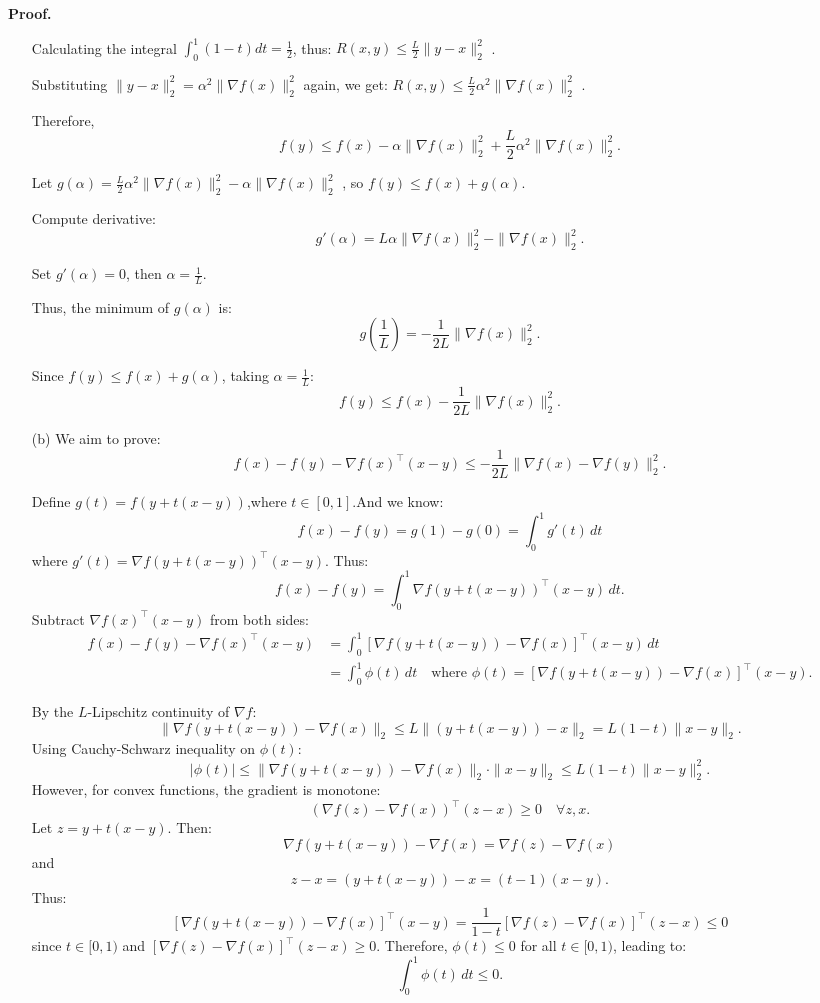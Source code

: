 \documentclass[a4paper, 11pt]{article}
\newenvironment{solution}
    {\textbf{Proof.}}
    {}
\begin{document}
\begin{solution}
\begin{enumerate}
Calculating the integral \( \int_0^1 (1 - t) dt = \frac{1}{2} \), thus: \( R(x, y) \leq \frac{L}{2} \|y - x\|_2^2 \) . 
	
Substituting \( \|y - x\|_2^2 = \alpha^2 \|\nabla f(x)\|_2^2 \) again, we get: \( R(x, y) \leq \frac{L}{2} \alpha^2 \|\nabla f(x)\|_2^2 \) . 

  
Therefore, 
$$ f(y) \leq f(x) - \alpha \|\nabla f(x)\|_2^2 + \frac{L}{2} \alpha^2 \|\nabla f(x)\|_2^2 .$$
 
Let  \(g(\alpha) = \frac{L}{2} \alpha^2 \|\nabla f(x)\|_2^2 - \alpha \|\nabla f(x)\|_2^2  \) ,	so  \(f(y) \leq f(x) + g(\alpha)\).

Compute derivative:  
$$ g'(\alpha) = L \alpha \|\nabla f(x)\|_2^2 - \|\nabla f(x)\|_2^2 .$$  

Set  \(g'(\alpha) = 0 \), then \( \alpha = \frac{1}{L} \).

Thus, the minimum of  \(g(\alpha)\)  is: 
 $$g\left( \frac{1}{L} \right) = -\frac{1}{2L} \|\nabla f(x)\|_2^2 .$$  

Since  \(f(y) \leq f(x) + g(\alpha)\), taking  \(\alpha = \frac{1}{L}\):
$$ f(y) \leq f(x) - \frac{1}{2L} \|\nabla f(x)\|_2^2. $$  
 
	
\item[(b)] 
We aim to prove:
$$
f(x) - f(y) - \nabla f(x)^\top (x - y) \leq -\frac{1}{2L} \|\nabla f(x) - \nabla f(y)\|_2^2.
$$

Define \( g(t) = f(y + t(x - y)) \),where \( t \in [0, 1] \).And we know:
$$
f(x) - f(y) = g(1) - g(0) = \int_0^1 g'(t) \, dt
$$
where \( g'(t) = \nabla f(y + t(x - y))^\top (x - y) \). Thus:
$$
f(x) - f(y) = \int_0^1 \nabla f(y + t(x - y))^\top (x - y) \, dt.
$$
Subtract \( \nabla f(x)^\top (x - y) \) from both sides:
$$
\begin{align*}
	f(x) - f(y) - \nabla f(x)^\top (x - y) 
	&= \int_0^1 \left[ \nabla f(y + t(x - y)) - \nabla f(x) \right]^\top (x - y) \, dt \\
	&= \int_0^1 \phi(t) \, dt \quad \text{where } \phi(t) = \left[ \nabla f(y + t(x - y)) - \nabla f(x) \right]^\top (x - y).
\end{align*}
$$

By the \( L \)-Lipschitz continuity of \( \nabla f \):
$$
\|\nabla f(y + t(x - y)) - \nabla f(x)\|_2 \leq L \|(y + t(x - y)) - x\|_2 = L (1 - t) \|x - y\|_2.
$$
Using Cauchy-Schwarz inequality on \( \phi(t) \):
$$
|\phi(t)| \leq \|\nabla f(y + t(x - y)) - \nabla f(x)\|_2 \cdot \|x - y\|_2 \leq L (1 - t) \|x - y\|_2^2.
$$
However, for convex functions, the gradient is monotone:
$$
(\nabla f(z) - \nabla f(x))^\top (z - x) \geq 0 \quad \forall z, x.
$$
Let \( z = y + t(x - y) \). Then:
$$
\nabla f(y + t(x - y)) - \nabla f(x) = \nabla f(z) - \nabla f(x)
$$
and
$$
z - x = (y + t(x - y)) - x = (t - 1)(x - y).
$$
Thus:
$$
\left[ \nabla f(y + t(x - y)) - \nabla f(x) \right]^\top (x - y) = \frac{1}{1 - t} \left[ \nabla f(z) - \nabla f(x) \right]^\top (z - x) \leq 0
$$
since \( t \in [0, 1) \) and \( \left[ \nabla f(z) - \nabla f(x) \right]^\top (z - x) \geq 0 \). Therefore, \( \phi(t) \leq 0 \) for all \( t \in [0, 1) \), leading to:
$$
\int_0^1 \phi(t) \, dt \leq 0.
$$


\end{enumerate}
\end{solution}
\end{document}
